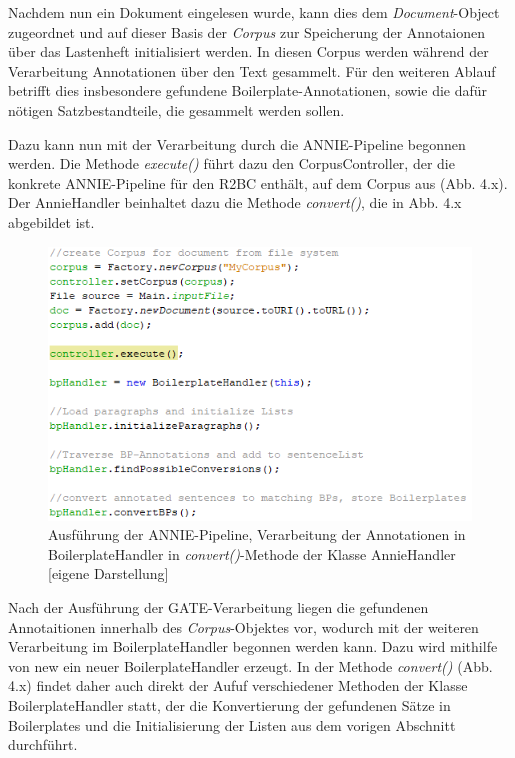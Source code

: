 \documentclass[12pt]{report}
\begin{document}
Nachdem nun ein Dokument eingelesen wurde, kann dies dem \textit{Document}-Object zugeordnet und auf dieser Basis der \textit{Corpus} zur Speicherung der Annotaionen über das Lastenheft initialisiert werden. In diesen Corpus werden während der Verarbeitung Annotationen über den Text gesammelt. Für den weiteren Ablauf betrifft dies insbesondere gefundene Boilerplate-Annotationen, sowie die dafür nötigen Satzbestandteile, die gesammelt werden sollen. 

Dazu kann nun mit der Verarbeitung durch die ANNIE-Pipeline begonnen werden. Die Methode \textit{execute()} führt dazu den CorpusController, der die konkrete ANNIE-Pipeline für den R2BC enthält, auf dem Corpus aus (Abb. 4.x). Der AnnieHandler beinhaltet dazu die Methode \textit{convert()}, die in Abb. 4.x abgebildet ist.

\begin{figure}[h!]
\begin{center}
\includegraphics[scale=1]{Bilder/AnnieHandler-execute.png}
\caption{Ausführung der ANNIE-Pipeline, Verarbeitung der Annotationen in BoilerplateHandler in \textit{convert()}-Methode der Klasse AnnieHandler [eigene Darstellung]}
\end{center}
\end{figure}

Nach der Ausführung der GATE-Verarbeitung liegen die gefundenen Annotaitionen innerhalb des \textit{Corpus}-Objektes vor, wodurch mit der weiteren Verarbeitung im BoilerplateHandler begonnen werden kann. Dazu wird mithilfe von new ein neuer BoilerplateHandler erzeugt.
In der Methode \textit{convert()} (Abb. 4.x) findet daher auch direkt der Aufuf verschiedener Methoden der Klasse BoilerplateHandler statt, der die Konvertierung der gefundenen Sätze in Boilerplates und die Initialisierung der Listen aus dem vorigen Abschnitt durchführt. 
\end{document}
